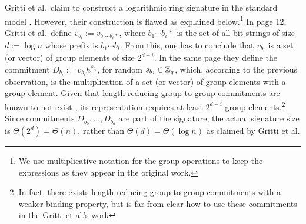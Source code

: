 Gritti et al.~claim to construct a logarithmic ring signature in the standard model \cite{IET:GriSusPla16}. However, their construction is flawed as explained below.\footnote{We use multiplicative notation for the group operations to keep the expressions as they appear in the original work.}
In page 12, Gritti et al.~define $v_{b_i} := v_{b_1\cdots b_i *}$, where $b_1\cdots b_i *$ is the set of all bit-strings of size $d:=\log n$ whose prefix is $b_1\cdots b_i$. From this, one has to conclude that $v_{b_i}$ is a set (or vector) of group elements of size $2^{d-i}$.
In the same page they define the commitment $D_{b_i} := v_{b_i}h^{s_{b_i}}$, for random $s_{b_i}\in\mathbb{Z}_q$, which, according to the previous observation, is the multiplication of a set (or vector) of group elements with a group element. Given that length reducing group to group commitments are known to not exist \cite{EC:AbeHarOhk12}, its representation requires at least $2^{d-i}$ group elements.\footnote{In fact, there exists length reducing group to group commitments \cite{EC:AKOT15} with a weaker binding property, but is far from clear how to use these commitments in the Gritti et al.'s work} Since commitments $D_{b_0},\ldots,D_{b_d}$ are part of the signature, the actual signature size is $\Theta(2^d)=\Theta(n)$, rather than  $\Theta(d)=\Theta(\log n)$ as claimed by Gritti et al.

